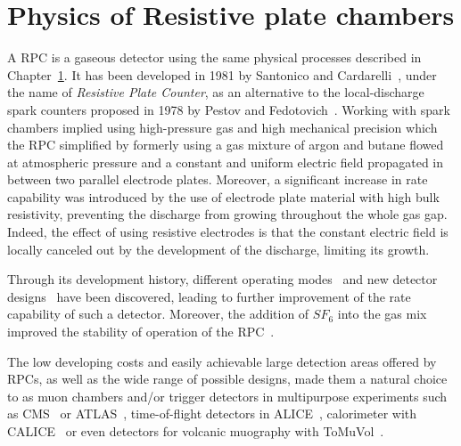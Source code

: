 \renewcommand\evenpagerightmark{{\scshape\small Chapter 3}}
\renewcommand\oddpageleftmark{{\scshape\small Amplification processes in gaseous detectors}}

\renewcommand{\bibname}{References}

\hyphenation{}

\chapter[Physics of Resistive plate chambers]%
{Physics of Resistive plate chambers}
\label{chapt:3}

A \acf{RPC} is a gaseous detector using the same physical processes described in Chapter~\ref{chapt:3}. It has been developed in 1981 by Santonico and Cardarelli~\cite{SANTONICO81}, under the name of \textit{Resistive Plate Counter}, as an alternative to the local-discharge spark counters proposed in 1978 by Pestov and Fedotovich~\cite{PESTOV78,FEDOTOVICH82}. Working with spark chambers implied using high-pressure gas and high mechanical precision which the RPC simplified by formerly using a gas mixture of argon and butane flowed at atmospheric pressure and a constant and uniform electric field propagated in between two parallel electrode plates. Moreover, a significant increase in rate capability was introduced by the use of electrode plate material with high bulk resistivity, preventing the discharge from growing throughout the whole gas gap. Indeed, the effect of using resistive electrodes is that the constant electric field is locally canceled out by the development of the discharge, limiting its growth.
	
	Through its development history, different operating modes~\cite{CROTTY93,CROTTY94,CARDARELLI96} and new detector designs~\cite{ZEBALLOS96MRPC,WILLIAMS98,CZYRKOWSKI98} have been discovered, leading to further improvement of the rate capability of such a detector. Moreover, the addition of $SF_6$ into the gas mix improved the stability of operation of the RPC~\cite{CAMARRI98,ZEBALLOS98}.
	
	The low developing costs and easily achievable large detection areas offered by RPCs, as well as the wide range of possible designs, made them a natural choice to as muon chambers and/or trigger detectors in multipurpose experiments such as CMS~\cite{MUONTDR} or ATLAS~\cite{ATLASTDR}, time-of-flight detectors in ALICE~\cite{ALICETDR}, calorimeter with CALICE~\cite{CALICE2016} or even detectors for volcanic muography with ToMuVol~\cite{TOMUVOL2011}. 

